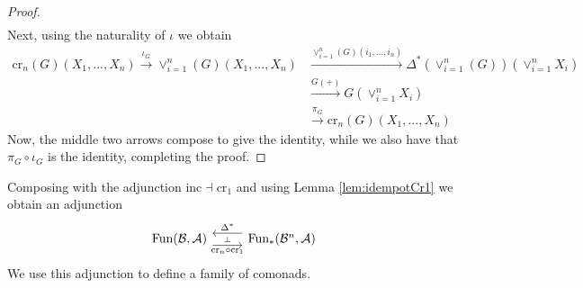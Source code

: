 \begin{proof}
\begin{align*}
    \end{align*}
    Next, using the naturality of $\iota$ we obtain
    \begin{align*}
        \text{cr}_n(G)(X_1,...,X_n)\xrightarrow{\iota_G}\lor_{i=1}^n(G)(X_1,...,X_n)&\xrightarrow{\lor_{i=1}^n(G)(i_1,...,i_n)}\Delta^*(\lor_{i=1}^n(G))(\lor_{i=1}^nX_i) \\
        &\xrightarrow{G(+)}G(\lor_{i=1}^nX_i) \\
        &\xrightarrow{\pi_G}\text{cr}_n(G)(X_1,...,X_n)
    \end{align*}
    Now, the middle two arrows compose to give the identity, while we also have that $\pi_G\circ \iota_G$ is the identity, completing the proof.

\end{proof}

Composing with the adjunction $\text{inc}\dashv \text{cr}_1$ and using Lemma \ref{lem:idempotCr1} we obtain an adjunction
\[\begin{tikzcd}
	{\text{Fun}(\mathcal{B},\mathcal{A})} & {\text{Fun}_*(\mathcal{B}^n,\mathcal{A})}
	\arrow[""{name=0, anchor=center, inner sep=0}, "{\text{cr}_n\circ \text{cr}_1}"', shift right=2, from=1-1, to=1-2]
	\arrow[""{name=1, anchor=center, inner sep=0}, "{\Delta^*}"', shift right=2, from=1-2, to=1-1]
	\arrow["\dashv"{anchor=center, rotate=-90}, draw=none, from=1, to=0]
\end{tikzcd}\]
We use this adjunction to define a family of comonads.

